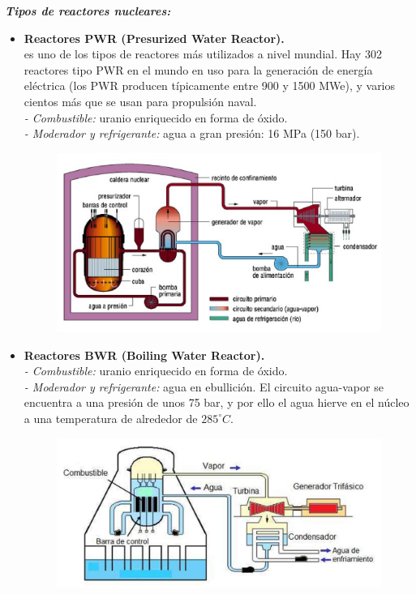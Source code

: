 			\textit{\textbf{Tipos de reactores nucleares:}}
				\begin{itemize}
					\item \textbf{Reactores PWR (Presurized Water Reactor).}\\
						es uno de los tipos de reactores más utilizados a nivel mundial. Hay 302 reactores tipo PWR en el mundo en uso para la generación de energía eléctrica (los PWR producen típicamente entre 900 y 1500 MWe), y varios cientos más que se usan para propulsión naval.\\
						\textit{- Combustible:} uranio enriquecido en forma de óxido.\\
						\textit{- Moderador y refrigerante:} agua a gran presión: 16 MPa (150 bar).
						
						\begin{figure}[H]
							\centering
							\includegraphics[width=0.7\linewidth]{res/tema1/pwr}
						\end{figure}
						
					\item \textbf{Reactores BWR (Boiling Water Reactor).}\\
						\textit{- Combustible:} uranio enriquecido en forma de óxido.\\
						\textit{- Moderador y refrigerante:} agua en ebullición. El circuito agua-vapor se encuentra a una presión de unos 75 bar, y por ello el agua hierve en el núcleo a una temperatura de alrededor de $285^\circ \textit{C}$.
						
						\begin{figure}[H]
							\centering
							\includegraphics[width=0.7\linewidth]{res/tema1/bwr}
						\end{figure}
						
				\end{itemize}
				

